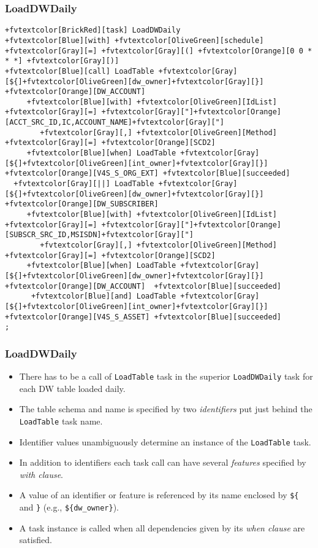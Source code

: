 \documentclass[english,xcolor={dvipsnames}]{beamer}
\begin{document}
\begin{frame}[fragile]
\frametitle{LoadDWDaily}
\begin{Verbatim}[commandchars=+\[\]]
+fvtextcolor[BrickRed][task] LoadDWDaily
+fvtextcolor[Blue][with] +fvtextcolor[OliveGreen][schedule] +fvtextcolor[Gray][=] +fvtextcolor[Gray][(] +fvtextcolor[Orange][0 0 * * *] +fvtextcolor[Gray][)]
+fvtextcolor[Blue][call] LoadTable +fvtextcolor[Gray][${]+fvtextcolor[OliveGreen][dw_owner]+fvtextcolor[Gray][}] +fvtextcolor[Orange][DW_ACCOUNT]
     +fvtextcolor[Blue][with] +fvtextcolor[OliveGreen][IdList] +fvtextcolor[Gray][=] +fvtextcolor[Gray]["]+fvtextcolor[Orange][ACCT_SRC_ID,IC,ACCOUNT_NAME]+fvtextcolor[Gray]["]
        +fvtextcolor[Gray][,] +fvtextcolor[OliveGreen][Method] +fvtextcolor[Gray][=] +fvtextcolor[Orange][SCD2]
     +fvtextcolor[Blue][when] LoadTable +fvtextcolor[Gray][${]+fvtextcolor[OliveGreen][int_owner]+fvtextcolor[Gray][}] +fvtextcolor[Orange][V4S_S_ORG_EXT] +fvtextcolor[Blue][succeeded]
  +fvtextcolor[Gray][||] LoadTable +fvtextcolor[Gray][${]+fvtextcolor[OliveGreen][dw_owner]+fvtextcolor[Gray][}] +fvtextcolor[Orange][DW_SUBSCRIBER]
     +fvtextcolor[Blue][with] +fvtextcolor[OliveGreen][IdList] +fvtextcolor[Gray][=] +fvtextcolor[Gray]["]+fvtextcolor[Orange][SUBSCR_SRC_ID,MSISDN]+fvtextcolor[Gray]["]
        +fvtextcolor[Gray][,] +fvtextcolor[OliveGreen][Method] +fvtextcolor[Gray][=] +fvtextcolor[Orange][SCD2]
     +fvtextcolor[Blue][when] LoadTable +fvtextcolor[Gray][${]+fvtextcolor[OliveGreen][dw_owner]+fvtextcolor[Gray][}]  +fvtextcolor[Orange][DW_ACCOUNT]  +fvtextcolor[Blue][succeeded]
      +fvtextcolor[Blue][and] LoadTable +fvtextcolor[Gray][${]+fvtextcolor[OliveGreen][int_owner]+fvtextcolor[Gray][}] +fvtextcolor[Orange][V4S_S_ASSET] +fvtextcolor[Blue][succeeded]
;
\end{Verbatim}
\end{frame}

\begin{frame}[fragile]
\frametitle{LoadDWDaily}
\begin{itemize}
    \item There has to be a call of \verb|LoadTable| task in the superior \verb|LoadDWDaily| task for each DW table loaded daily.
    \item The table schema and name is specified by two \emph{identifiers} put just behind the \verb|LoadTable| task name.
    \item Identifier values unambiguously determine an instance of the \verb|LoadTable| task.
    \item In addition to identifiers each task call can have several \emph{features} specified by \emph{with clause}.
    \item A value of an identifier or feature is referenced by its name enclosed by \verb|${| and \verb|}| (e.g., \verb|${dw_owner}|).
    \item A task instance is called when all dependencies given by its \emph{when clause} are satisfied.
\end{itemize}
\end{frame}
\end{document}
